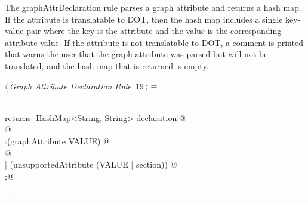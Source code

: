 \documentclass[a4paper]{report}
\begin{document}
The graphAttrDeclaration rule parses a graph attribute and returns a hash map. If the attribute is translatable to DOT, then the hash map includes a single key-value pair where the key is the attribute and the value is the corresponding attribute value. If the attribute is not translatable to DOT, a comment is printed that warns the user that the graph attribute was parsed but will not be translated, and the hash map that is returned is empty.
\begin{flushleft} \small
\begin{minipage}{\linewidth}\label{scrap19}\raggedright\small
{} $\langle\,${\itshape Graph Attribute Declaration Rule}\nobreak\ {\footnotesize {19}}$\,\rangle\equiv$
\vspace{-1ex}
\begin{list}{}{} \item
\mbox{}\verb@@\\
\mbox{}\verb@graphAttrDeclaration returns [HashMap<String, String> declaration]@\\
\mbox{}@\\
\mbox{}\verb@:(graphAttribute VALUE) @\\
\mbox{}@\\
\mbox{}\verb@| (unsupportedAttribute (VALUE | section)) @\\
\mbox{};@\\
\mbox{}\verb@@{\NWsep}
\end{list}
\vspace{-1.5ex}
\footnotesize
\begin{list}{}{\setlength{\itemsep}{-\parsep}\setlength{\itemindent}{-\leftmargin}}
\item \NWtxtMacroRefIn\ .

\item{}
\end{list}
\end{minipage}\vspace{4ex}
\end{flushleft}
\end{document}
